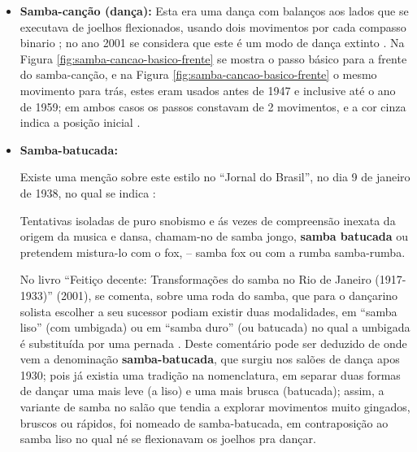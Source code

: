 \begin{itemize}

\item \textbf{Samba-canção (dança):}
Esta era uma dança com balanços aos lados que se executava de joelhos flexionados,
usando dois movimentos por cada compasso binario \cite[pp. 58]{freitas1959danca} 
\cite[pp. 51]{fornaciari1947aprender} \cite[pp. 143]{perna2002samba}; 
no ano 2001 se considera que este é um modo de dança extinto \cite[pp. 143]{perna2002samba}. %
Na Figura \ref{fig:samba-cancao-basico-frente} se mostra o passo básico para a frente do samba-canção,
e na  Figura \ref{fig:samba-cancao-basico-frente} o mesmo movimento para trás,
estes eram usados antes de 1947 e inclusive até o ano de 1959;
em ambos casos os passos constavam de 2 movimentos, e a cor cinza indica a posição inicial \cite[pp. 51]{fornaciari1947aprender} \cite[pp. 59-60]{freitas1959danca}. 



\item \textbf{Samba-batucada:}

Existe uma menção sobre este estilo no ``Jornal do Brasil'', no dia 9 de janeiro de 1938,
no qual se indica \cite[pp. 4]{musicasambavariasdef1}:
\begin{citando}%
Tentativas isoladas de puro 
snobismo e ás vezes de compreensão 
inexata da origem da 
musica e dansa, chamam-no de samba jongo, \textbf{samba batucada} ou
pretendem mistura-lo com o fox, -- samba fox ou com a rumba samba-rumba.
\end{citando}



No livro ``Feitiço decente: Transformações do samba no Rio de Janeiro (1917-1933)'' (2001),
se comenta, sobre uma roda do samba, que para o dançarino solista  escolher a seu sucessor podiam
existir duas modalidades, em ``samba liso'' (com umbigada) ou em ``samba duro'' 
(ou batucada) no qual a umbigada é substituída por uma pernada \cite[pp. 109]{sandroni2001feitico}.
Deste comentário pode ser deduzido de onde vem a denominação \textbf{samba-batucada}, 
que surgiu nos salões de dança apos 1930; pois já existia uma tradição na nomenclatura,
em separar duas formas de dançar uma mais leve (a liso) e uma mais brusca (batucada);
assim, a variante de samba no salão que tendia a explorar movimentos muito  gingados, bruscos ou rápidos,
foi nomeado de samba-batucada, em contraposição ao samba liso no qual né se flexionavam os joelhos pra dançar.  




\end{itemize}
